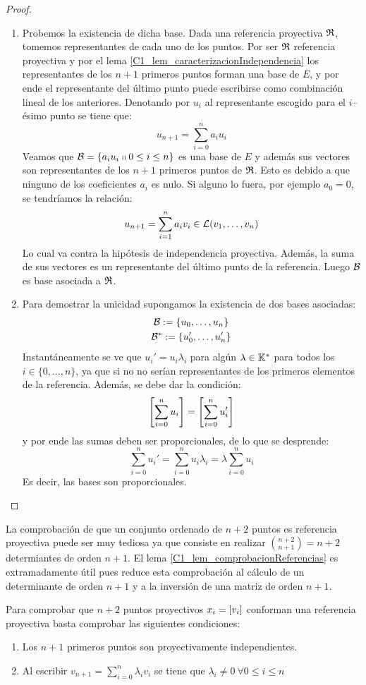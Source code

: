 \begin{proof}
	\begin{enumerate}
		\item Probemos la existencia de dicha base. Dada una referencia proyectiva $\mathfrak{R}$, tomemos representantes de cada uno de los puntos. Por ser $\mathfrak{R}$ referencia proyectiva y por el lema \ref{C1_lem_caracterizacionIndependencia} los representantes de los $n+1$ primeros puntos forman una base de $E$, y por ende el representante del último punto puede escribirse como combinación lineal de los anteriores. Denotando por $u_i$ al representante escogido para el $i$--ésimo punto se tiene que:
		\[u_{n+1}=\sum_{i=0}^{n}a_iu_i\]
		Veamos que $\mathcal{B}=\{a_iu_i\shortparallel 0\leq i\leq n\}$ es una base de $E$ y además sus vectores son representantes de los $n+1$ primeros puntos de $\mathfrak{R}$. Esto es debido a que ninguno de los coeficientes $a_i$ es nulo. Si alguno lo fuera, por ejemplo $a_0=0$, se tendríamos la relación:
		\[
		u_{n+1}=\sum_{i=1}^{n}a_iv_i\in\mathcal{L}(v_1,\dots,v_n)
		\] Lo cual va contra la hipótesis de independencia proyectiva. Además, la suma de sus vectores es un representante del último punto de la referencia. Luego $\mathcal{B}$ es base asociada a $\mathfrak{R}$.
		\item Para demostrar la unicidad supongamos la existencia de dos bases asociadas:
		\begin{gather*}
			\mathcal{B}:=\{u_0,\dots,u_n\}\\
			\mathcal{B}^*:=\{u_0',\dots,u_n'\}
		\end{gather*}
		Instantáneamente se ve que $u_i'=u_i\lambda_i$ para algún $\lambda\in\mathbb{K}^*$ para todos los $i\in\{0,\dots,n\}$, ya que si no no serían representantes de los primeros elementos de la referencia. Además, se debe dar la condición:
		\[\left [ \sum_{i=0}^{n}u_i \right ]=\left [ \sum_{i=0}^{n}u_i' \right ]\] y por ende las sumas deben ser proporcionales, de lo que se desprende:
		\[\sum_{i=0}^{n}u_i'=\sum_{i=0}^{n}u_i\lambda_i=\lambda\sum_{i=0}^{n}u_i\]
		Es decir, las bases son proporcionales.
	\end{enumerate}
\end{proof}
La comprobación de que un conjunto ordenado de $n+2$ puntos es referencia proyectiva puede ser muy tediosa ya que consiste en realizar $\binom{n+2}{n+1}=n+2$ determiantes de orden $n+1$. El lema \ref{C1_lem_comprobacionReferencias} es extramadamente útil pues reduce esta comprobación al cálculo de un determinante de orden $n+1$ y a la inversión de una matriz de orden $n+1$.
\begin{lem}
	\label{C1_lem_comprobacionReferencias}
	Para comprobar que $n+2$ puntos proyectivos $x_i=\left [ v_i \right ]$ conforman una referencia proyectiva basta comprobar las siguientes condiciones:\begin{enumerate}
		\item Los $n+1$ primeros puntos son proyectivamente independientes.
		\item Al escribir $v_{n+1}=\sum_{i=0}^{n}\lambda_iv_i$ se tiene que $\lambda_i\not=0\ \forall 0\leq i\leq n$
	\end{enumerate}
\end{lem}
